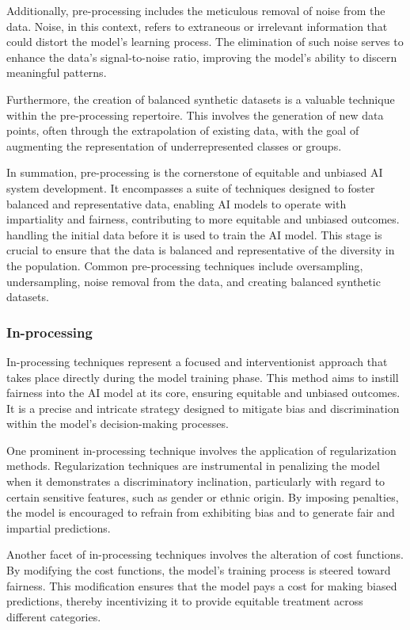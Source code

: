 \documentclass[12pt,a4paper,openright,twoside]{book}
\begin{document}
Additionally, pre-processing includes the meticulous removal of noise from the data. Noise, in this context, refers to extraneous or irrelevant information that could distort the model's learning process. The elimination of such noise serves to enhance the data's signal-to-noise ratio, improving the model's ability to discern meaningful patterns. 

Furthermore, the creation of balanced synthetic datasets is a valuable technique within the pre-processing repertoire. This involves the generation of new data points, often through the extrapolation of existing data, with the goal of augmenting the representation of underrepresented classes or groups. 

In summation, pre-processing is the cornerstone of equitable and unbiased AI system development. It encompasses a suite of techniques designed to foster balanced and representative data, enabling AI models to operate with impartiality and fairness, contributing to more equitable and unbiased outcomes. handling the initial data before it is used to train the AI model. This stage is crucial to ensure that the data is balanced and representative of the diversity in the population. Common pre-processing techniques include oversampling, undersampling, noise removal from the data, and creating balanced synthetic datasets.

\subsubsection{In-processing}

In-processing techniques represent a focused and interventionist approach that takes place directly during the model training phase. This method aims to instill fairness into the AI model at its core, ensuring equitable and unbiased outcomes. It is a precise and intricate strategy designed to mitigate bias and discrimination within the model's decision-making processes. 

One prominent in-processing technique involves the application of regularization methods. Regularization techniques are instrumental in penalizing the model when it demonstrates a discriminatory inclination, particularly with regard to certain sensitive features, such as gender or ethnic origin. By imposing penalties, the model is encouraged to refrain from exhibiting bias and to generate fair and impartial predictions. 

Another facet of in-processing techniques involves the alteration of cost functions. By modifying the cost functions, the model's training process is steered toward fairness. This modification ensures that the model pays a cost for making biased predictions, thereby incentivizing it to provide equitable treatment across different categories. 
\end{document}
